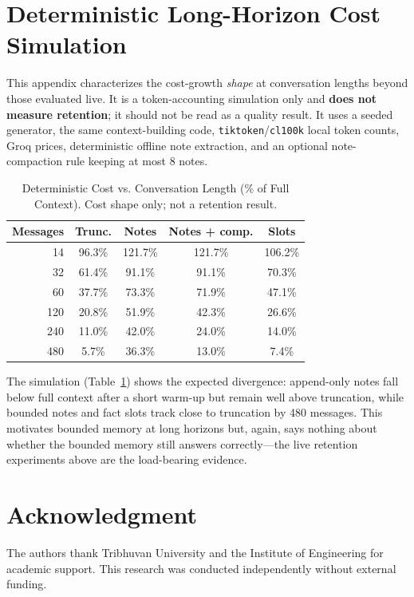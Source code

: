 \documentclass[conference]{IEEEtran}
\begin{document}
\appendices
\section{Deterministic Long-Horizon Cost Simulation}
\label{app:sim}

This appendix characterizes the cost-growth \emph{shape} at conversation lengths beyond those evaluated live. It is a token-accounting simulation only and \textbf{does not measure retention}; it should not be read as a quality result. It uses a seeded generator, the same context-building code, \texttt{tiktoken}/\texttt{cl100k} local token counts, Groq prices, deterministic offline note extraction, and an optional note-compaction rule keeping at most 8 notes.

\begin{table}[h]
\centering
\caption{Deterministic Cost vs. Conversation Length (\% of Full Context). Cost shape only; not a retention result.}
\label{tab:growth}
\begin{tabular}{rcccc}
\toprule
\textbf{Messages} & \textbf{Trunc.} & \textbf{Notes} & \textbf{Notes + comp.} & \textbf{Slots} \\
\midrule
14 & 96.3\% & 121.7\% & 121.7\% & 106.2\% \\
32 & 61.4\% & 91.1\% & 91.1\% & 70.3\% \\
60 & 37.7\% & 73.3\% & 71.9\% & 47.1\% \\
120 & 20.8\% & 51.9\% & 42.3\% & 26.6\% \\
240 & 11.0\% & 42.0\% & 24.0\% & 14.0\% \\
480 & 5.7\% & 36.3\% & 13.0\% & 7.4\% \\
\bottomrule
\end{tabular}
\end{table}

The simulation (Table~\ref{tab:growth}) shows the expected divergence: append-only notes fall below full context after a short warm-up but remain well above truncation, while bounded notes and fact slots track close to truncation by 480 messages. This motivates bounded memory at long horizons but, again, says nothing about whether the bounded memory still answers correctly---the live retention experiments above are the load-bearing evidence.

\section*{Acknowledgment}

The authors thank Tribhuvan University and the Institute of Engineering for academic support. This research was conducted independently without external funding.
\end{document}
